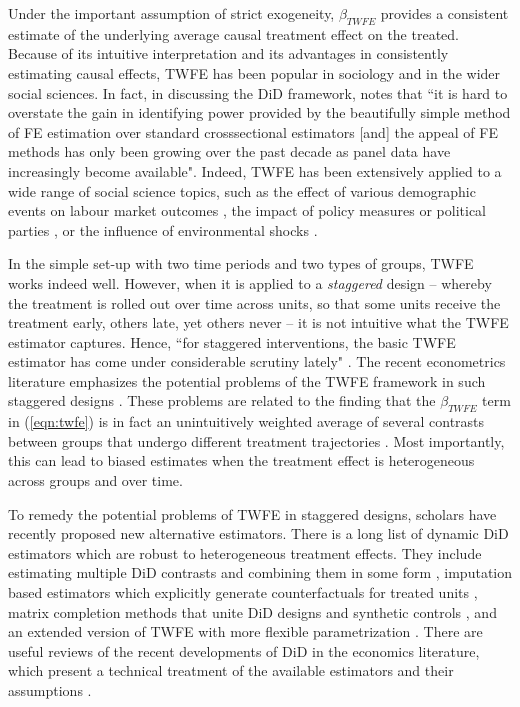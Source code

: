 Under the important assumption of strict exogeneity, $\beta_{TWFE}$ provides a consistent estimate of the underlying average causal treatment effect on the treated. Because of its intuitive interpretation and its advantages in consistently estimating causal effects, TWFE has been popular in sociology and in the wider social sciences. In fact, in discussing the DiD framework, \textcite[][43]{Gangl.2010} notes that ``it is hard to overstate the gain in identifying power provided by the beautifully simple method of FE estimation over standard crosssectional estimators [and] the appeal of FE methods has only been growing over the past decade as panel data have increasingly become available". Indeed, TWFE has been extensively applied to a wide range of social science topics, such as the effect of various demographic events on labour market outcomes \cite{Bruderl.2019,Schechtl.2023,Struffolino.2023,Zoch.2023}, the impact of policy measures or political parties \cite{Currie.2023, Dochow.2021, Kneip.2009, Aksoy.2021}, or the influence of environmental shocks \cite{Currie.2015, Osberghaus.2022, Ruttenauer.2023a}.

In the simple set-up with two time periods and two types of groups, TWFE works indeed well. However, when it is applied to a \emph{staggered} design -- whereby the treatment is rolled out over time across units, so that some units receive the treatment early, others late, yet others never -- it is not intuitive what the TWFE estimator captures. Hence, ``for staggered interventions, the basic TWFE estimator has come under considerable scrutiny lately" \cite[][33]{Wooldridge.2021}. The recent econometrics literature emphasizes the potential problems of the TWFE framework in such staggered designs \cite{Goodman-Bacon.2021, Callaway.2020, Sun.2021, Wooldridge.2021, DeChaisemartin.2020}. These problems are related to the finding that the $\beta_{TWFE}$ term in (\ref{eqn:twfe}) is in fact an unintuitively weighted average of several contrasts between groups that undergo different treatment trajectories \cite{Goodman-Bacon.2021}. Most importantly, this can lead to biased estimates when the treatment effect is heterogeneous across groups and over time. 

To remedy the potential problems of TWFE in staggered designs, scholars have recently proposed new alternative estimators. There is a long list of dynamic DiD estimators which are robust to heterogeneous treatment effects. They include estimating multiple DiD contrasts and combining them in some form \cite{Callaway.2020, Sun.2021}, imputation based estimators which explicitly generate counterfactuals for treated units \cite{Borusyak.2023}, matrix completion methods that unite DiD designs and synthetic controls \cite{Athey.2021}, and an extended  version of TWFE with more flexible parametrization \cite{Wooldridge.2021}. There are useful reviews of the recent developments of DiD in the economics literature, which present a technical treatment of the available estimators and their assumptions \cite[e.g.,][]{Freedman.2023,Roth.2023}. 

